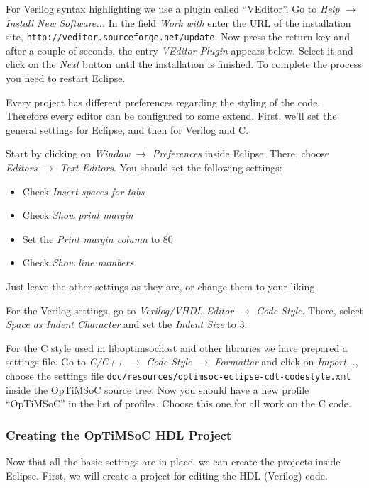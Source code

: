 For Verilog syntax highlighting we use a plugin called ``VEditor''. Go to
\emph{Help $\rightarrow$ Install New Software...} In the field \emph{Work with}
enter the URL of the installation site,
\verb|http://veditor.sourceforge.net/update|. Now press the return key and after
a couple of seconds, the entry \emph{VEditor Plugin} appears below. Select it
and click on the \emph{Next} button until the installation is finished. To
complete the process you need to restart Eclipse.

Every project has different preferences regarding the styling of the code.
Therefore every editor can be configured to some extend. First, we'll set the
general settings for Eclipse, and then for Verilog and C.

Start by clicking on \emph{Window $\rightarrow$ Preferences} inside Eclipse.
There, choose \emph{Editors $\rightarrow$ Text Editors}. You should set the
following settings:

\begin{itemize}
 \item Check \emph{Insert spaces for tabs}
 \item Check \emph{Show print margin}
 \item Set the \emph{Print margin column} to 80
 \item Check \emph{Show line numbers}
\end{itemize}

Just leave the other settings as they are, or change them to your liking.

For the Verilog settings, go to \emph{Verilog/VHDL Editor $\rightarrow$ Code
Style}. There, select \emph{Space as Indent Character} and set the \emph{Indent
Size} to 3.

For the C style used in liboptimsochost and other libraries we have prepared a
settings file. Go to \emph{C/C++ $\rightarrow$ Code Style $\rightarrow$
Formatter} and click on \emph{Import...}, choose the settings file
\verb|doc/resources/optimsoc-eclipse-cdt-codestyle.xml| inside the OpTiMSoC
source tree. Now you should have a new profile ``OpTiMSoC'' in the list of
profiles. Choose this one for all work on the C code.

\subsubsection{Creating the OpTiMSoC HDL Project}

Now that all the basic settings are in place, we can create the projects inside
Eclipse. First, we will create a project for editing the HDL (Verilog) code.

